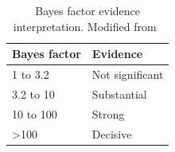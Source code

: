 \begin{table}[tb]
\centering
\caption{Bayes factor evidence interpretation. Modified from~\textcite{Kass:1995vb}}
\label{tab:BAYES_FACTS}
\begin{tabular}{@{}ll@{}}
\toprule
Bayes factor & Evidence \\ \midrule
1 to 3.2 & Not significant \\
3.2 to 10 & Substantial \\
10 to 100 & Strong \\
\textgreater 100 & Decisive \\ \bottomrule
\end{tabular}
\end{table}








